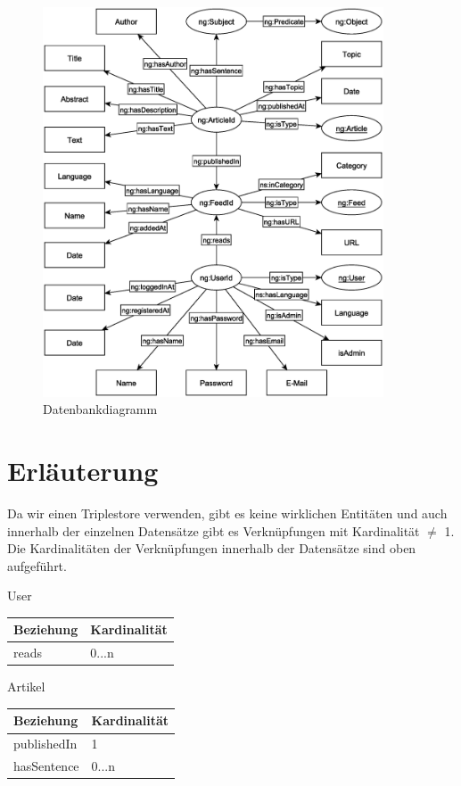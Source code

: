 \begin{figure}[ht]
\centering
\includegraphics[width=0.90\textwidth]{Systementwurf/datenmodell/DBDiagramm.eps}
\caption{Datenbankdiagramm}
\label{fig:6.1}
\end{figure}
\section{Erläuterung}

Da wir einen Triplestore verwenden, gibt es keine wirklichen Entitäten und auch innerhalb der einzelnen Datensätze gibt es Verknüpfungen mit Kardinalität \( \neq\) 1. Die Kardinalitäten der Verknüpfungen innerhalb der Datensätze sind oben aufgeführt.

\begin{entity}{10}{User}
\begin{tabular}[ht]{|l|l|}
  \hline
  Beziehung & Kardinalität\\
  \hline
  reads & 0...n\\
  \hline
\end{tabular}
\end{entity}

\begin{entity}{20}{Artikel}
\begin{tabular}[ht]{|l|l|}
  \hline
  Beziehung & Kardinalität\\
  \hline
  publishedIn & 1\\
  \hline
  hasSentence & 0...n\\
  \hline
\end{tabular}
\end{entity}